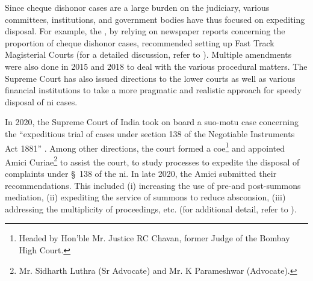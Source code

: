 \documentclass[12pt,a4paper]{article}
\begin{document}
	Since cheque dishonor cases are a large burden on the judiciary, various committees, institutions, and government bodies have thus focused on expediting disposal. For example, the \cite{lci2008_138}, by relying on newspaper reports concerning the proportion of cheque dishonor cases, recommended setting up Fast Track Magisterial Courts (for a detailed discussion, refer to \cite{bhan2015_placing}). Multiple amendments were also done in 2015 and 2018 to deal with the various procedural matters. The Supreme Court has also issued directions to the lower courts as well as various financial institutions to take a more pragmatic and realistic approach for speedy disposal of \gls{ni} cases.  
	
	
	
	In 2020, the Supreme Court of India took on board a suo-motu case concerning the “expeditious trial of cases under section 138 of the Negotiable Instruments Act 1881” \autocite{sc2020_138}. Among other directions, the court formed a \gls{coe}\footnote{Headed by Hon’ble Mr. Justice RC Chavan, former Judge of the Bombay High Court.} and appointed Amici Curiae\footnote{Mr. Sidharth Luthra (Sr Advocate) and Mr. K Parameshwar (Advocate).} to assist the court, to study processes to expedite the disposal of complaints under \S~138 of the \gls{ni}. In late 2020, the Amici submitted their recommendations. This included (i) increasing the use of pre-and post-summons mediation, (ii) expediting the service of summons to reduce absconsion, (iii) addressing the multiplicity of proceedings, etc. (for additional detail, refer to \cite{amicus2020_submission}).
	
\end{document}
